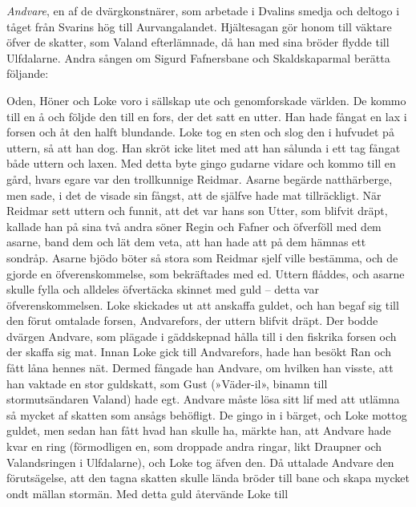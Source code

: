 \emph{Andvare}, en af de dvärgkonstnärer, som arbetade i Dvalins smedja
och deltogo i tåget från Svarins hög till Aurvangalandet. Hjältesagan
gör honom till väktare öfver de skatter, som Valand efterlämnade, då han
med sina bröder flydde till Ulfdalarne. Andra sången om Sigurd
Fafnersbane och Skaldskaparmal berätta följande:

Oden, Höner och Loke voro i sällskap ute och genomforskade världen. De
kommo till en å och följde den till en fors, der det satt en utter. Han
hade fångat en lax i forsen och åt den halft blundande. Loke tog en sten
och slog den i hufvudet på uttern, så att han dog. Han skröt icke litet
med att han sålunda i ett tag fångat både uttern och laxen. Med detta
byte gingo gudarne vidare och kommo till en gård, hvars egare var den
trollkunnige Reidmar. Asarne begärde natthärberge, men sade, i det de
visade sin fångst, att de själfve hade mat tillräckligt. När Reidmar
sett uttern och funnit, att det var hans son Utter, som blifvit dräpt,
kallade han på sina två andra söner Regin och Fafner och öfverföll med
dem asarne, band dem och lät dem veta, att han hade att på dem hämnas
ett sondråp. Asarne bjödo böter så stora som Reidmar sjelf ville
bestämma, och de gjorde en öfverenskommelse, som bekräftades med ed.
Uttern flåddes, och asarne skulle fylla och alldeles öfvertäcka skinnet
med guld -- detta var öfverenskommelsen.
\protect\hypertarget{lb1625905.xhtmlux5cux23start202}{}{}\protect\hypertarget{lb1625905.xhtmlux5cux23start202-a}{}{}\protect\hypertarget{lb1625905.xhtmlux5cux23start202-b}{}{}\protect\hypertarget{lb1625905.xhtmlux5cux23start202-c}{}{}\protect\hypertarget{lb1625905.xhtmlux5cux23start202-d}{}{}
Loke skickades ut att anskaffa guldet, och han begaf sig till den förut
omtalade forsen, Andvarefors, der uttern blifvit dräpt. Der bodde
dvärgen Andvare, som plägade i gäddskepnad hålla till i den fiskrika
forsen och der skaffa sig mat. Innan Loke gick till Andvarefors, hade
han besökt Ran och fått låna hennes nät. Dermed fångade han Andvare, om
hvilken han visste, att han vaktade en stor guldskatt, som Gust
(»Väder-il», binamn till stormutsändaren Valand) hade egt. Andvare måste
lösa sitt lif med att utlämna så mycket af skatten som ansågs behöfligt.
De gingo in i bärget, och Loke mottog guldet, men sedan han fått hvad
han skulle ha, märkte han, att Andvare hade kvar en ring (förmodligen
en, som droppade andra ringar, likt Draupner och Valandsringen i
Ulfdalarne), och Loke tog äfven den. Då uttalade Andvare den
förutsägelse, att den tagna skatten skulle lända bröder till bane och
skapa mycket ondt mällan stormän. Med detta guld återvände Loke till
